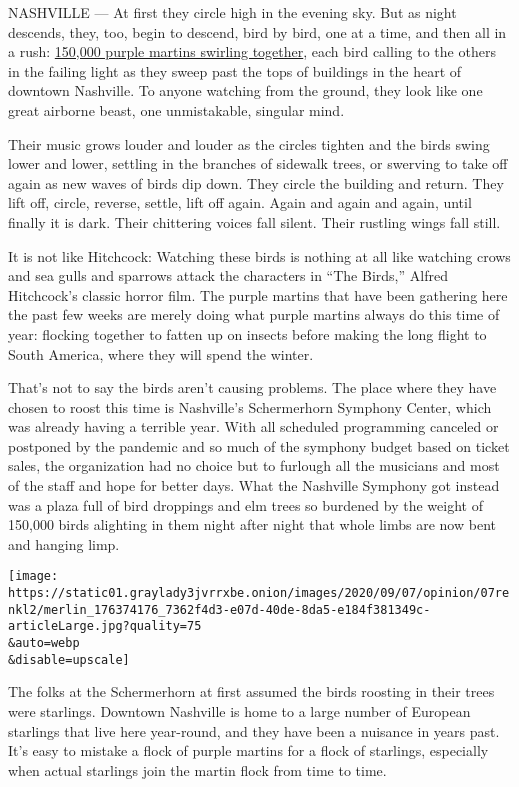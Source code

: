 NASHVILLE --- At first they circle high in the evening sky. But as night
descends, they, too, begin to descend, bird by bird, one at a time, and
then all in a rush:
\href{https://www.instagram.com/p/CEfrnK0BMwn/?igshid=rgygk0ym4lzz}{150,000
purple martins swirling together}, each bird calling to the others in
the failing light as they sweep past the tops of buildings in the heart
of downtown Nashville. To anyone watching from the ground, they look
like one great airborne beast, one unmistakable, singular mind.

Their music grows louder and louder as the circles tighten and the birds
swing lower and lower, settling in the branches of sidewalk trees, or
swerving to take off again as new waves of birds dip down. They circle
the building and return. They lift off, circle, reverse, settle, lift
off again. Again and again and again, until finally it is dark. Their
chittering voices fall silent. Their rustling wings fall still.

It is not like Hitchcock: Watching these birds is nothing at all like
watching crows and sea gulls and sparrows attack the characters in ``The
Birds,'' Alfred Hitchcock's classic horror film. The purple martins that
have been gathering here the past few weeks are merely doing what purple
martins always do this time of year: flocking together to fatten up on
insects before making the long flight to South America, where they will
spend the winter.

That's not to say the birds aren't causing problems. The place where
they have chosen to roost this time is Nashville's Schermerhorn Symphony
Center, which was already having a terrible year. With all scheduled
programming canceled or postponed by the pandemic and so much of the
symphony budget based on ticket sales, the organization had no choice
but to furlough all the musicians and most of the staff and hope for
better days. What the Nashville Symphony got instead was a plaza full of
bird droppings and elm trees so burdened by the weight of 150,000 birds
alighting in them night after night that whole limbs are now bent and
hanging limp.

\texttt{[image: https://static01.graylady3jvrrxbe.onion/images/2020/09/07/opinion/07renkl2/merlin\_176374176\_7362f4d3-e07d-40de-8da5-e184f381349c-articleLarge.jpg?quality=75\\\&auto=webp\\\&disable=upscale]}

The folks at the Schermerhorn at first assumed the birds roosting in
their trees were starlings. Downtown Nashville is home to a large number
of European starlings that live here year-round, and they have been a
nuisance in years past. It's easy to mistake a flock of purple martins
for a flock of starlings, especially when actual starlings join the
martin flock from time to time.

